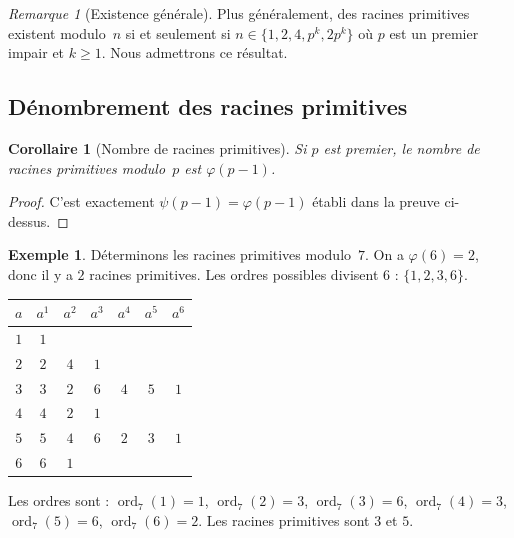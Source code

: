 \documentclass[12pt,a4paper,openany]{book}
\theoremstyle{definition}
\newtheorem{exemple}[definition]{Exemple}
\theoremstyle{plain}
\newtheorem{corollaire}[definition]{Corollaire}
\theoremstyle{remark}
\newtheorem{remarque}[definition]{Remarque}
\DeclareMathOperator{\ord}{ord}
\begin{document}
\begin{remarque}[Existence générale]
\label{rem:rac-prim-generale}
Plus généralement, des racines primitives existent modulo~$n$ si et seulement si
$n \in \{1, 2, 4, p^k, 2p^k\}$ où $p$ est un premier impair et $k \geqslant 1$.
Nous admettrons ce résultat.
\end{remarque}

\subsection{Dénombrement des racines primitives}
\label{subsec:comptage-rac-prim}

\begin{corollaire}[Nombre de racines primitives]
\label{cor:nb-rac-prim}
Si $p$ est premier, le nombre de racines primitives modulo~$p$ est
$\varphi(p - 1)$.
\end{corollaire}

\begin{proof}
C'est exactement $\psi(p-1) = \varphi(p-1)$ établi dans la preuve ci-dessus.
\end{proof}

\begin{exemple}
\label{ex:rac-prim-7}
Déterminons les racines primitives modulo~$7$. On a $\varphi(6) = 2$, donc il y a
$2$ racines primitives. Les ordres possibles divisent $6$ : $\{1, 2, 3, 6\}$.

\medskip
\begin{center}
\begin{tabular}{c|cccccc}
  $a$ & $a^1$ & $a^2$ & $a^3$ & $a^4$ & $a^5$ & $a^6$ \\
  \hline
  $1$ & $1$ & & & & & \\
  $2$ & $2$ & $4$ & $1$ & & & \\
  $3$ & $3$ & $2$ & $6$ & $4$ & $5$ & $1$ \\
  $4$ & $4$ & $2$ & $1$ & & & \\
  $5$ & $5$ & $4$ & $6$ & $2$ & $3$ & $1$ \\
  $6$ & $6$ & $1$ & & & & \\
\end{tabular}
\end{center}
\medskip

Les ordres sont : $\ord_7(1)=1$, $\ord_7(2)=3$, $\ord_7(3)=6$, $\ord_7(4)=3$,
$\ord_7(5)=6$, $\ord_7(6)=2$. Les racines primitives sont $3$ et $5$.
\end{exemple}
\end{document}
